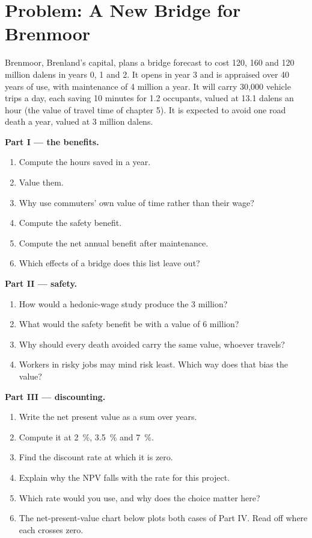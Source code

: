 \section{Problem: A New Bridge for Brenmoor}\label{sec:b3:cost-benefit-analysis:problem}

\begin{problem}\label{pb:b3:cost-benefit-analysis:bridge}
Brenmoor, Brenland's capital, plans a bridge forecast to cost 120, 160 and 120
million dalens in years 0, 1 and 2. It opens in year 3 and is appraised over 40 years
of use, with maintenance of 4 million a year. It will carry 30{,}000 vehicle trips a
day, each saving 10 minutes for 1.2 occupants, valued at 13.1 dalens an hour (the
value of travel time of chapter 5). It is expected to avoid one road death a year,
valued at 3 million dalens. %

\medskip\noindent\textbf{Part I --- the benefits.}
\begin{enumerate}
\item Compute the hours saved in a year.
\item Value them.
\item Why use commuters' own value of time rather than their wage?
\item Compute the safety benefit.
\item Compute the net annual benefit after maintenance.
\item Which effects of a bridge does this list leave out?
\end{enumerate}

\medskip\noindent\textbf{Part II --- safety.}
\begin{enumerate}[resume]
\item How would a hedonic-wage study produce the 3 million?
\item What would the safety benefit be with a value of 6 million?
\item Why should every death avoided carry the same value, whoever travels?
\item Workers in risky jobs may mind risk least. Which way does that bias the value?
\end{enumerate}

\medskip\noindent\textbf{Part III --- discounting.}
\begin{enumerate}[resume]
\item Write the net present value as a sum over years.
\item Compute it at 2~\%, 3.5~\% and 7~\%.
\item Find the discount rate at which it is zero.
\item Explain why the NPV falls with the rate for this project.
\item Which rate would you use, and why does the choice matter here?
\item The net-present-value chart below plots both cases of Part IV. Read off where
each crosses zero.
\end{enumerate}


\end{problem}
